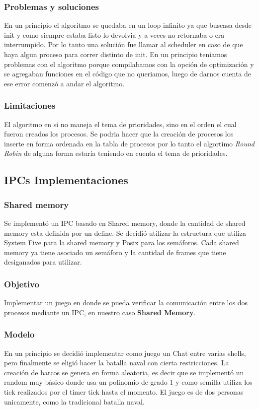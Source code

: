 \documentclass[10pt,a4paper]{article}
\begin{document}
	\subsubsection{Problemas y soluciones}
		En un principio el algoritmo se quedaba en un loop infinito ya que buscasa desde init y como siempre estaba listo lo devolvia y a veces no retornaba o era interrumpido. Por lo tanto una soluci\'on fue llamar al scheduler en caso de que haya algun proceso para correr distinto de init. En un principio teniamos problemas con el algoritmo porque compilabamos con la opci\'on de optimizaci\'on y se agregaban funciones en el c\'odigo que no queriamos, luego de darnos cuenta de ese error comenz\'o a andar el algoritmo.
	\subsubsection{Limitaciones}
		El algoritmo en si no maneja el tema de prioridades, sino en el orden el cual fueron creados los procesos. Se podria hacer que la creaci\'on de procesos los inserte en forma ordenada en la tabla de procesos por lo tanto el algortimo \textit{Round Robin} de alguna forma estar\'ia teniendo en cuenta el tema de prioridades.

\subsection{IPCs Implementaciones}
	\subsubsection{Shared memory}
		Se implement\'o un IPC basado en Shared memory, donde la cantidad de shared memory esta definida por un define. Se decidi\'o utilizar la estructura que utiliza System Five para la shared memory y Posix para los sem\'aforos. Cada shared memory ya tiene asociado un sem\'aforo y la cantidad de frames que tiene desiganados para utilizar.
	\subsubsection{Objetivo}
		Implementar un juego en donde se pueda verificar la comunicaci\'on entre los dos procesos mediante un IPC, en nuestro caso \textbf{Shared Memory}.
	\subsubsection{Modelo}
		En un principio se decidi\'o implementar como juego un Chat entre varias shells, pero finalmente se eligi\'o hacer la batalla naval con cierta restricciones. La creaci\'on de barcos se genera en forma aleatoria, es decir que se implement\'o un random muy b\'asico donde usa un polinomio de grado 1 y como semilla utiliza los tick realizados por el timer tick hasta el momento. El juego es de dos personas unicamente, como la tradicional batalla naval.
\end{document}
